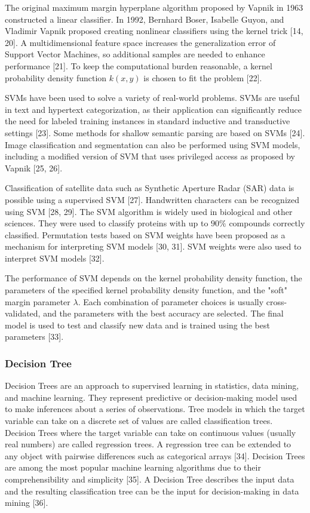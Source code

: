 \documentclass[sn-mathphys-num]{sn-jnl}%
\begin{document}
The original maximum margin hyperplane algorithm proposed by Vapnik in 1963 constructed a linear classifier. In 1992, Bernhard Boser, Isabelle Guyon, and Vladimir Vapnik proposed creating nonlinear classifiers using the kernel trick [14, 20]. A multidimensional feature space increases the generalization error of Support Vector Machines, so additional samples are needed to enhance performance [21]. To keep the computational burden reasonable, a kernel probability density function $k(x, y)$ is chosen to fit the problem [22].

SVMs have been used to solve a variety of real-world problems. SVMs are useful in text and hypertext categorization, as their application can significantly reduce the need for labeled training instances in standard inductive and transductive settings [23]. Some methods for shallow semantic parsing are based on SVMs [24]. Image classification and segmentation can also be performed using SVM models, including a modified version of SVM that uses privileged access as proposed by Vapnik [25, 26].

Classification of satellite data such as Synthetic Aperture Radar (SAR) data is possible using a supervised SVM [27]. Handwritten characters can be recognized using SVM [28, 29]. The SVM algorithm is widely used in biological and other sciences. They were used to classify proteins with up to $90\%$ compounds correctly classified. Permutation tests based on SVM weights have been proposed as a mechanism for interpreting SVM models [30, 31]. SVM weights were also used to interpret SVM models [32].

The performance of SVM depends on the kernel probability density function, the parameters of the specified kernel probability density function, and the "soft" margin parameter $\lambda$. Each combination of parameter choices is usually cross-validated, and the parameters with the best accuracy are selected. The final model is used to test and classify new data and is trained using the best parameters [33].

\subsubsection{Decision Tree}

Decision Trees are an approach to supervised learning in statistics, data mining, and machine learning. They represent predictive or decision-making model used to make inferences about a series of observations. Tree models in which the target variable can take on a discrete set of values are called classification trees. Decision Trees where the target variable can take on continuous values (usually real numbers) are called regression trees. A regression tree can be extended to any object with pairwise differences such as categorical arrays [34]. Decision Trees are among the most popular machine learning algorithms due to their comprehensibility and simplicity [35]. A Decision Tree describes the input data and the resulting classification tree can be the input for decision-making in data mining [36].
\end{document}
